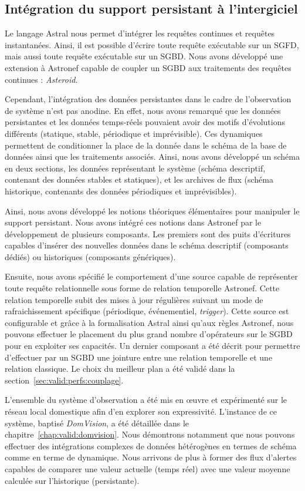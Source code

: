 \subsection{Intégration du support persistant à l'intergiciel}
Le langage Astral nous permet d'intégrer les requêtes continues et requêtes instantanées. Ainsi, il est possible d'écrire toute requête exécutable sur un SGFD, mais aussi toute requête exécutable sur un SGBD. Nous avons développé une extension à Astronef capable de coupler un SGBD aux traitements des requêtes continues : \textit{Asteroid}.

Cependant, l'intégration des données persistantes dans le cadre de l'observation de système n'est pas anodine. En effet, nous avons remarqué que les données persistantes et les données temps-réels pouvaient avoir des motifs d'évolutions différents (statique, stable, périodique et imprévisible). Ces dynamiques permettent de conditionner la place de la donnée dans le schéma de la base de données ainsi que les traitements associés. Ainsi, nous avons développé un schéma en deux sections, les données représentant le système (schéma descriptif, contenant des données stables et statiques), et les archives de flux (schéma historique, contenants des données périodiques et imprévisibles).

Ainsi, nous avons développé les notions théoriques élémentaires pour manipuler le support persistant. Nous avons intégré ces notions dans Astronef par le développement de plusieurs composants. Les premiers sont des puits d'écritures capables d'insérer des nouvelles données dans le schéma descriptif (composants dédiés) ou historiques (composants génériques).

Ensuite, nous avons spécifié le comportement d'une source capable de représenter toute requête relationnelle sous forme de relation temporelle Astronef. Cette relation temporelle subit des mises à jour régulières suivant un mode de rafraichissement spécifique (périodique, événementiel, \textit{trigger}). Cette source est configurable et grâce à la formalisation Astral ainsi qu'aux règles Astronef, nous pouvons effectuer le placement du plus grand nombre d'opérateurs sur le SGBD pour en exploiter ses capacités. Un dernier composant a été décrit pour permettre d'effectuer par un SGBD une jointure entre une relation temporelle et une relation classique. Le choix du meilleur plan a été validé dans la section~\ref{sec:valid:perfs:couplage}.

L'ensemble du système d'observation a été mis en œuvre et expérimenté sur le réseau local domestique afin d'en explorer son expressivité. L'instance de ce système, baptisé \textit{DomVision}, a été détaillée dans le chapitre~\ref{chap:valid:domvision}. Nous démontrons notamment que nous pouvons effectuer des intégrations complexes de données hétérogènes en termes de schéma comme en terme de dynamique. Nous arrivons de plus à former des flux d'alertes capables de comparer une valeur actuelle (temps réel) avec une valeur moyenne calculée sur l'historique (persistante).
